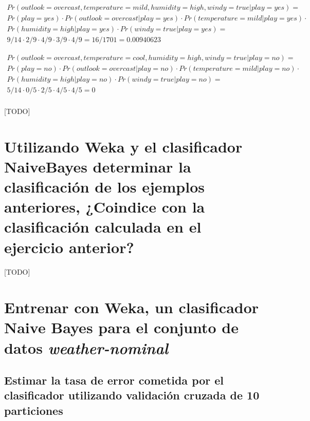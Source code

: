 \documentclass{article}
\begin{document}
		\begin{align}
			Pr(outlook = overcast, temperature = mild, humidity = high, windy = true | play = yes) = \\
			Pr(play = yes) \cdot Pr(outlook = overcast | play = yes) \cdot Pr(temperature = mild | play = yes) \cdot \\
			Pr(humidity = high 	| play = yes) \cdot Pr(windy = true 	| play = yes) = \\
			9/14 \cdot 2/9 \cdot 4/9 \cdot 3/9 \cdot 4/9 = 16/1701 = 0.00940623
		\end{align}

		\begin{align}
			Pr(outlook = overcast, temperature = cool, humidity = high, windy = true | play = no) = \\
			Pr(play = no) \cdot Pr(outlook = overcast | play = no) \cdot Pr(temperature = mild | play = no) \cdot \\
			Pr(humidity = high 	| play = no) \cdot Pr(windy = true | play = no) =\\
			5/14 \cdot 0/5 \cdot 2/5 \cdot 4/5 \cdot  4/5 = 0
		\end{align}

		\paragraph{}
		[TODO]

	\section{Utilizando Weka y el clasificador NaiveBayes determinar la clasificación de los ejemplos anteriores, ¿Coindice con la clasificación calculada en el ejercicio anterior?}
	\label{sec:e4}

		\paragraph{}
		[TODO]

	\section{Entrenar con Weka, un clasificador Naive Bayes para el conjunto de datos \emph{weather-nominal}}
	\label{sec:e5}

		\subsection{Estimar la tasa de error cometida por el clasificador utilizando validación cruzada de 10 particiones}
\end{document}

